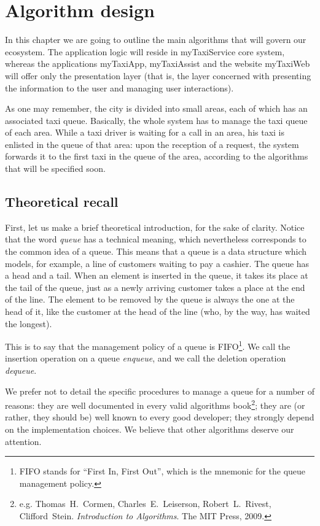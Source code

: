 \chapter{Algorithm design} \label{chap:algorithm}
In this chapter we are going to outline the main algorithms that will govern our ecosystem. The application logic will reside in myTaxiService core system, whereas the applications myTaxiApp, myTaxiAssist and the website myTaxiWeb will offer only the presentation layer (that is, the layer concerned with presenting the information to the user and managing user interactions). 

As one may remember, the city is divided into small areas, each of which has an associated taxi queue. Basically, the whole system has to manage the taxi queue of each area. While a taxi driver is waiting for a call in an area, his taxi is enlisted in the queue of that area: upon the reception of a request, the system forwards it to the first taxi in the queue of the area, according to the algorithms that will be specified soon.


\section{Theoretical recall}
First, let us make a brief theoretical introduction, for the sake of clarity. Notice that the word \emph{queue} has a technical meaning, which nevertheless corresponds to the common idea of a queue. This means that a queue is a data structure which models, for example, a line of customers waiting to pay a cashier. The queue has a head and a tail. When an element is inserted in the queue, it takes its place at the tail of the queue, just as a newly arriving customer takes a place at the end of the line. The element to be removed by the queue is always the one at the head of it, like the customer at the head of the line (who, by the way, has waited the longest).

This is to say that the management policy of a queue is FIFO\footnote{FIFO stands for ``First In, First Out'', which is the mnemonic for the queue management policy.}. We call the insertion operation on a queue \emph{enqueue}, and we call the deletion operation \emph{dequeue}.

We prefer not to detail the  specific procedures to manage a queue for a number of reasons: they are well documented in every valid algorithms book\footnote{e.g. Thomas~H.~Cormen, Charles~E.~Leiserson, Robert~L.~Rivest, Clifford~Stein. \emph{Introduction to Algorithms}. The MIT Press, 2009.}; they are (or rather, they should be) well known to every good developer; they strongly depend on the implementation choices. We believe that other algorithms deserve our attention.

